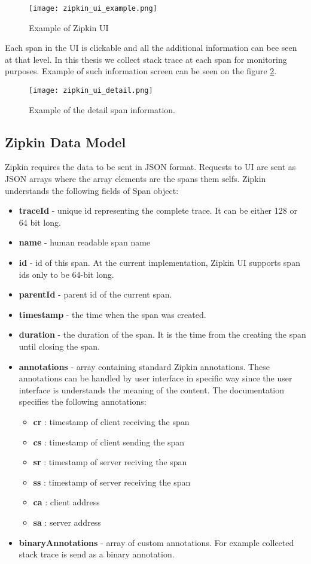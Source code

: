 \begin{figure}
	\centering
	\texttt{[image: zipkin\_ui\_example.png]}
	\caption{Example of Zipkin UI}
	\label{fig:zipkin_ui}
\end{figure}

Each span in the UI is clickable and all the additional information can bee seen at that level. In this thesis we collect stack trace at each span for monitoring purposes. Example of such information screen can be seen on the figure \ref{fig:zipkin_ui_detail}.
\begin{figure}
	\centering
	\texttt{[image: zipkin\_ui\_detail.png]}
	\caption{Example of the detail span information.}
	\label{fig:zipkin_ui_detail}
\end{figure}
\subsection{Zipkin Data Model}
Zipkin requires the data to be sent in JSON format. Requests to UI are sent as JSON arrays where the array elements are the spans them selfs. Zipkin understands the following fields of Span object:
\begin{itemize}
	\item \textbf{traceId} - unique id representing the complete trace. It can be either 128 or 64 bit long.
	\item \textbf{name} - human readable span name
	\item \textbf{id} - id of this span. At the current implementation, Zipkin UI supports span ids only to be 64-bit long.
	\item \textbf{parentId} - parent id of the current span.
	\item \textbf{timestamp} - the time when the span was created.
	\item \textbf{duration} - the duration of the span. It is the time from the creating the span until closing the span.
	\item \textbf{annotations} - array containing standard Zipkin annotations. These annotations can be handled by user interface in specific way since the user interface is understands the meaning of the content. The documentation specifies the following annotations:
	\begin{itemize}
		\item \textbf{cr} : timestamp of client receiving the span
		\item \textbf{cs} : timestamp of client sending the span
		\item \textbf{sr} : timestamp of server reciving the span
		\item \textbf{ss} : timestamp of server receiving the span
		\item \textbf{ca} : client address
		\item \textbf{sa} : server address
	\end{itemize}
	\item \textbf{binaryAnnotations} - array of custom annotations. For example collected stack trace is send as a binary annotation.
\end{itemize}

